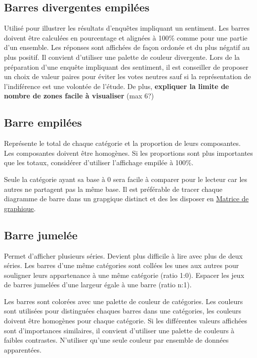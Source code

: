 \documentclass[a4paper,12pt]{article}
\begin{document}
\begin{multicols}{2}
\subsection*{Barres divergentes empilées}
\label{sec:org022beb4}
Utilisé pour illustrer les résultats d'enquêtes impliquant un sentiment. \autocite{alansmithLexiqueVisuel} Les barres doivent être calculées en pourcentage et alignées à 100\% comme pour une partie d'un ensemble. Les réponses sont affichées de façon ordonée et du plus négatif au plus positif. Il convient d'utiliser une palette de couleur divergente. Lors de la préparation d'une enquête impliquant des sentiment, il est conseiller de proposer un choix de valeur paires pour éviter les votes neutres sauf si la représentation de l'indiférence est une volontée de l'étude. De plus, \textbf{expliquer la limite de nombre de zones facile à visualiser} (max 6?)
\subsection*{Barre empilées}
\label{sec:org78fcebf}
Représente le total de chaque catégorie et la proportion de leurs composantes. Les composantes doivent être homogènes. Si les proportions sont plus importantes que les totaux, considérer d'utiliser l'affichage empilée à 100\%. \autocite{mikeyiHowChooseRight2020}

Seule la catégorie ayant sa base à 0 sera facile à comparer pour le lecteur car les autres ne partagent pas la même base.\autocite{jonathanschwabishComparingCategories2021} Il est préférable de tracer chaque diagramme de barre dans un grapgique distinct et des les disposer en \hyperref[sec:org4b7bab9]{Matrice de graphique}. \autocite{jonathanschwabishComparingCategories2021}
\subsection*{Barre jumelée}
\label{sec:org74b66c7}
Permet d'afficher plusieurs séries. Devient plus difficile à lire avec plus de deux séries. \autocite{alansmithLexiqueVisuel}
Les barres d'une même catégories sont collées les unes aux autres pour souligner leurs appartenance à une même catégorie (ratio 1:0). Espacer les jeux de barres jumelées d'une largeur égale à une barre (ratio n:1).

Les barres sont colorées avec une palette de couleur de catégories. Les couleurs sont utilisées pour distinguées chaques barres dans une catégories, les couleurs doivent être homogènes pour chaque catégorie. Si les différentes valeurs affichées sont d'importances similaires, il convient d'utiliser une palette de couleurs à faibles contrastes. N'utiliser qu'une seule couleur par ensemble de données apparentées. \autocite{stephenfewComponentlevelGraphDesign2012}

\end{multicols}
\end{document}

